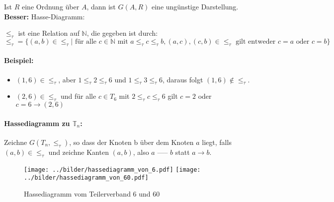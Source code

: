 \noindent Ist $R$ eine Ordnung über $A$, dann ist $G (A, R)$ eine ungünstige Darstellung. \\ {\bf Besser:} Hasse-Diagramm:

$\le_\tau$ ist eine Relation auf $\mathbb{N}$, die gegeben ist durch: \\
$ \le_\tau = \{ (a, b) \in \le_\tau | \text{ für alle } c \in \mathbb{N} \text{ mit } a \le_\tau c \le_\tau b, (a, c), (c, b) \in \le_\tau \text{ gilt entweder } c = a \text{ oder } c = b \}$

\paragraph{Beispiel:}
\begin{itemize}
\item $(1, 6) \in \le_\tau$, aber $1 \le_\tau 2 \le_\tau 6$ und
                                 $1 \le_\tau 3 \le_\tau 6$,
  daraus folgt $(1, 6) \not\in\le_\tau$.
 \item $(2, 6) \in \le_\tau$ und für alle $c \in T_6$ mit $2 \le_\tau c \le_\tau 6$ gilt $c = 2$ oder $c = 6 \rightarrow (2, 6)$
\end{itemize}

\paragraph{Hassediagramm zu $\mathbb{T}_n$:}

Zeichne $G (T_n, \le_\tau)$, so dass der Knoten b über dem Knoten $a$
liegt, falls $(a, b) \in \le_\tau$ und zeichne Kanten $(a, b)$, also
$a$ ----- $b$ statt $a \longrightarrow b$. \\

\begin{figure}[h]
  \texttt{[image: ../bilder/hassediagramm\_von\_6.pdf]}
  \texttt{[image: ../bilder/hassediagramm\_von\_60.pdf]}
  \caption{Hassediagramm vom Teilerverband 6 und 60}
\end{figure}
